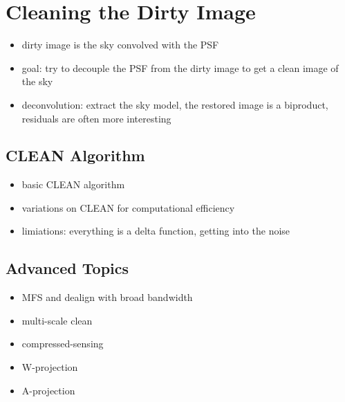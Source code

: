 \documentclass[usenatbib,usegraphicx]{article}
\begin{document}
\section{Cleaning the Dirty Image}

\begin{itemize}
\item dirty image is the sky convolved with the PSF
\item goal: try to decouple the PSF from the dirty image to get a clean image of the sky
\item deconvolution: extract the sky model, the restored image is a biproduct, residuals are often more interesting
\end{itemize}

\subsection{CLEAN Algorithm}

\begin{itemize}
\item basic CLEAN algorithm
\item variations on CLEAN for computational efficiency
\item limiations: everything is a delta function, getting into the noise
\end{itemize}

\subsection{Advanced Topics}

\begin{itemize}
\item MFS and dealign with broad bandwidth
\item multi-scale clean
\item compressed-sensing
\item W-projection
\item A-projection
\end{itemize}

\label{lastpage}
\end{document}
